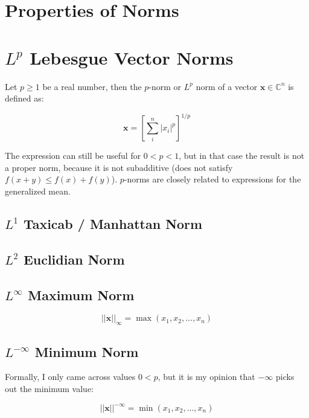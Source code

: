 \section{Properties of Norms}

\section{$L^p$ Lebesgue Vector Norms}
\label{lpnorms}

Let $p\geq1$ be a real number, then the $p$-norm or $L^p$ norm of a vector $\mathbf{x}\in\mathbb{C}^n$ is defined as:

\begin{equation}
\mathbf{x} = \left[ \sum^n_i |x_i|^p \right]^{1/p}
\end{equation}

The expression can still be useful for $0<p<1$, but in that case the result is not a proper norm, because it is not subadditive (does not satisfy $f(x+y) \leq f(x) + f(y)$). $p$-norms are closely related to expressions for the generalized mean.

\subsection{$L^{1}$ Taxicab / Manhattan Norm}

\subsection{$L^{2}$ Euclidian Norm}

\subsection{$L^{\infty}$ Maximum Norm} 

\begin{equation}
||\mathbf{x}||_{\infty} = \max(x_1,x_2,...,x_n)
\end{equation}

\subsection{$L^{-\infty}$ Minimum Norm} 

Formally, I only came across values $0<p$, but it is my opinion that $-\infty$ picks out the minimum value:

\begin{equation}
||\mathbf{x}||^{-\infty} = \min(x_1,x_2,...,x_n)
\end{equation}




